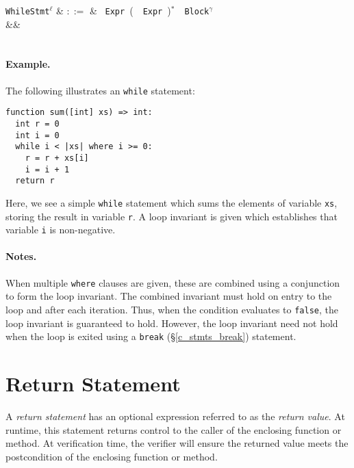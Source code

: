 \begin{syntax}
  \verb+WhileStmt+$^\ell$ & $::=$ & \ \verb+Expr+\ \big(\
  \ \verb+Expr+\ \big)$^*$\ \token{:}\ \verb+Block+$^\gamma$\ \\
&&\\
\\
\end{syntax}

\paragraph{Example.} The following illustrates an \lstinline{while} statement:

\begin{lstlisting}
function sum([int] xs) => int:
  int r = 0
  int i = 0
  while i < |xs| where i >= 0:
    r = r + xs[i]
    i = i + 1
  return r
\end{lstlisting}
Here, we see a simple \lstinline{while} statement which sums the elements of variable \lstinline{xs}, storing the result in variable \lstinline{r}.  A loop invariant is given which establishes that variable \lstinline{i} is non-negative.

\paragraph{Notes.}   When multiple \lstinline{where} clauses are given, these are combined using a conjunction to form the loop invariant.  The combined invariant must hold on entry to the loop and after each iteration.  Thus, when the condition evaluates to \lstinline{false}, the loop invariant is guaranteed to hold.  However, the loop invariant need not hold when the loop is exited using a \lstinline{break} (\S\ref{c_stmts_break}) statement.


\section{Return Statement}
\label{c_stmts_return}
A {\em return statement} has an optional expression referred to as the {\em return value}.  At runtime, this statement returns control to the caller of the enclosing function or method.  At verification time, the verifier will ensure the returned value meets the \gls{postcondition} of the enclosing function or method.


